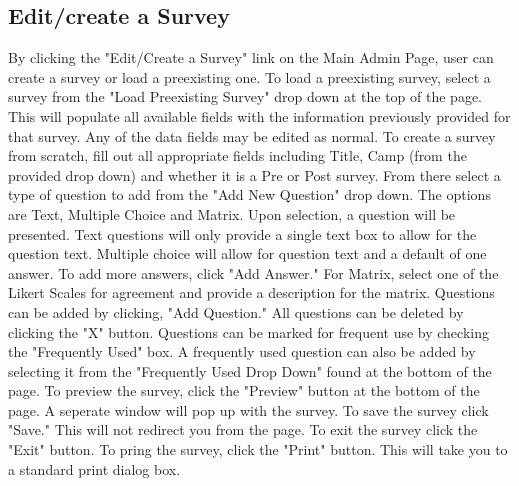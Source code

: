 \documentclass[letterpaper,10pt,serif, draftclsnofoot,onecolumn, compsoc, titlepage]{IEEEtran}
\begin{document}
\subsection{Edit/create a Survey}
By clicking the "Edit/Create a Survey" link on the Main Admin Page, user can create a survey or 
load a preexisting one. To load a preexisting survey, select a survey from the "Load Preexisting Survey"
 drop down at the top of the page. This will populate all available fields with the information 
 previously provided for that survey. Any of the data fields may be edited as normal. 
 To create a survey from scratch, fill out all appropriate fields including Title, Camp (from the provided 
 drop down) and whether it is a Pre or Post survey. From there select a type of question to add from the 
 "Add New Question" drop down. The options are Text, Multiple Choice and Matrix. Upon selection, a question will 
 be presented. Text questions will only provide a single text box to allow for the question text. 
 Multiple choice will allow for question text and a default of one answer. To add more answers, click "Add Answer."
 For Matrix, select one of the Likert Scales for agreement and provide a description for the matrix. Questions can 
 be added by clicking, "Add Question." All questions can be deleted by clicking the "X" button. Questions can be marked 
 for frequent use by checking the "Frequently Used" box. 
 A frequently used question can also be added by selecting it from the "Frequently Used Drop Down" 
 found at the bottom of the page. To preview the survey, click the "Preview" button at the bottom of the page. 
 A seperate window will pop up with the survey. To save the survey click "Save." This will not redirect you from 
 the page. To exit the survey click the "Exit" button. To pring the survey, click the "Print" button. This will take 
 you to a standard print dialog box. 
\end{document}
